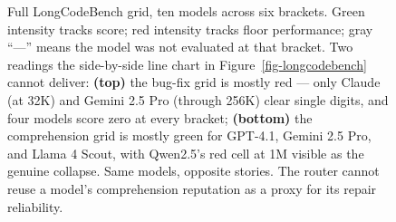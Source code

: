 {\begin{figure}[H]
\caption{Full LongCodeBench grid, ten models across six brackets. Green
intensity tracks score; red intensity tracks floor performance; gray
``---'' means the model was not evaluated at that bracket. Two readings the
side-by-side line chart in Figure~\ref{fig-longcodebench} cannot deliver:
\textbf{(top)} the bug-fix grid is mostly red --- only Claude (at 32K) and
Gemini 2.5 Pro (through 256K) clear single digits, and four
models score zero at every bracket; \textbf{(bottom)} the comprehension grid
is mostly green for GPT-4.1, Gemini 2.5 Pro, and Llama 4 Scout, with
Qwen2.5's red cell at 1M visible as the genuine collapse. Same models,
opposite stories. The router cannot reuse a model's comprehension reputation
as a proxy for its repair reliability.}
\label{fig-longcodebench-heatmap}
\end{figure}
}

